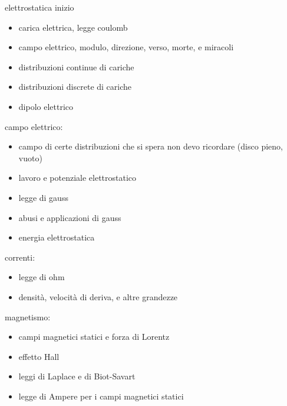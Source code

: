 \documentclass{article}
\begin{document}
elettrostatica inizio
\begin{itemize}
\item carica elettrica, legge coulomb
\item campo elettrico, modulo, direzione, verso, morte, e miracoli
\item distribuzioni continue di cariche
\item distribuzioni discrete di cariche
\item dipolo elettrico
\end{itemize}

campo elettrico:
\begin{itemize}
\item campo di certe distribuzioni che si spera non devo ricordare (disco pieno, vuoto)
\item lavoro e potenziale elettrostatico
\item legge di gauss
\item abusi e applicazioni di gauss
\item energia elettrostatica
\end{itemize}

correnti:
\begin{itemize}
\item legge di ohm
\item densità, velocità di deriva, e altre grandezze
\end{itemize}

magnetismo:
\begin{itemize}
\item campi magnetici statici e forza di Lorentz
\item effetto Hall
\item leggi di Laplace e di Biot-Savart
\item legge di Ampere per i campi magnetici statici
\end{itemize}
\end{document}
